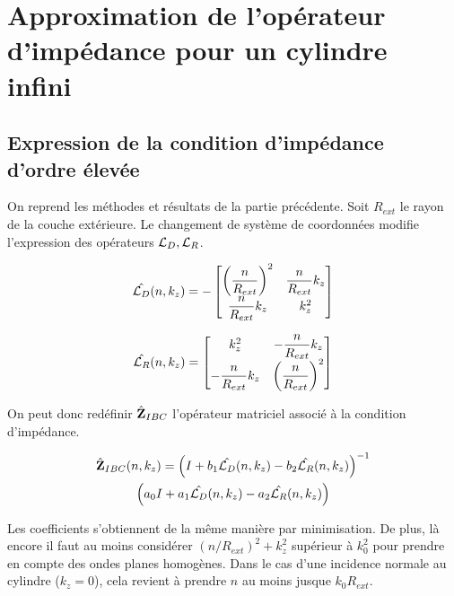 \section{Approximation de l'opérateur d'impédance pour un cylindre infini}

  \subsection{Expression de la condition d'impédance d'ordre élevée}

    On reprend les méthodes et résultats de la partie précédente.
    Soit \(R_{ext}\) le rayon de la couche extérieure.
    Le changement de système de coordonnées modifie l'expression des opérateurs \({\mathcal{L}_D}, {\mathcal{L}_R}\).

    \begin{equation}
      \hat{{\mathcal{L}_D}}(n,k_z) = -
      \begin{bmatrix}
        \left(\dfrac{n}{R_{ext}}\right)^2 & \dfrac{n}{R_{ext}} k_z
        \\
        \dfrac{n}{R_{ext}} k_z & k_z^2
      \end{bmatrix}
    \end{equation}

    \begin{equation}
      \hat{{\mathcal{L}_R}}(n,k_z) =
      \begin{bmatrix}
        k_z^2 & -\dfrac{n}{R_{ext}} k_z
        \\
        -\dfrac{n}{R_{ext}} k_z & \left(\dfrac{n}{R_{ext}}\right)^2
      \end{bmatrix}
    \end{equation}

    On peut donc redéfinir \(\hat{\mathbf{Z}}_{IBC}\) l’opérateur matriciel associé à la condition d'impédance. 

    \begin{multline}
        \hat{\mathbf{Z}}_{IBC}(n,k_z) = \left(I + b_1 \hat{{\mathcal{L}_D}}(n,k_z) - b_2 \hat{{\mathcal{L}_R}}(n,k_z) \right)^{-1}\\
        \left(a_0 I + a_1 \hat{{\mathcal{L}_D}}(n,k_z) - a_2 \hat{{\mathcal{L}_R}}(n,k_z)\right)
    \end{multline}

    Les coefficients s'obtiennent de la même manière par minimisation. 
    De plus, là encore il faut au moins considérer \((n\slash R_{ext})^2 + k_z^2\) supérieur à \(k_0^2\) pour prendre en compte des ondes planes homogènes. Dans le cas d'une incidence normale au cylindre (\(k_z = 0 \)), cela revient à prendre \(n\) au moins jusque \(k_0 R_{ext}\).

